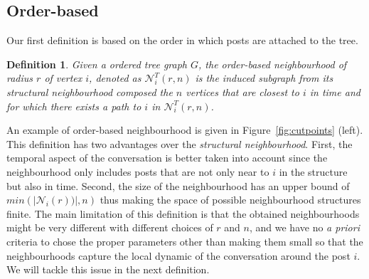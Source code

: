 \documentclass[conference]{IEEEtran}
\newtheorem{definition}{Definition}
\begin{document}
\subsection{Order-based}
Our first definition is based on the order in which posts are attached to the tree. 
\begin{definition}
Given a ordered tree graph $G$, the \textit{order-based neighbourhood} of radius $r$ of vertex $i$, denoted as $\mathcal{N}_{i}^T(r,n)$ is the induced subgraph from its structural neighbourhood composed the $n$ vertices that are closest to $i$ in time and for which there exists a path to $i$ in $\mathcal{N}_{i}^T(r,n)$.  
\end{definition}
An example of order-based neighbourhood is given in Figure~\ref{fig:cutpoints} (left).
This definition has two advantages over the \textit{structural neighbourhood}. First, the temporal aspect of the conversation is better taken into account since the neighbourhood only includes posts that are not only near to $i$ in the structure but also in time. Second, the size of the neighbourhood has an upper bound of $min(|\mathcal{N}_i(r))|, n)$ thus making the space of possible neighbourhood structures finite. The main limitation of this definition is that the obtained neighbourhoods might be very different with different choices of $r$ and $n$, and we have no \textit{a priori} criteria to chose the proper parameters other than making them small so that the neighbourhoods capture the local dynamic of the conversation around the post $i$. We will tackle this issue in the next definition.
\end{document}
